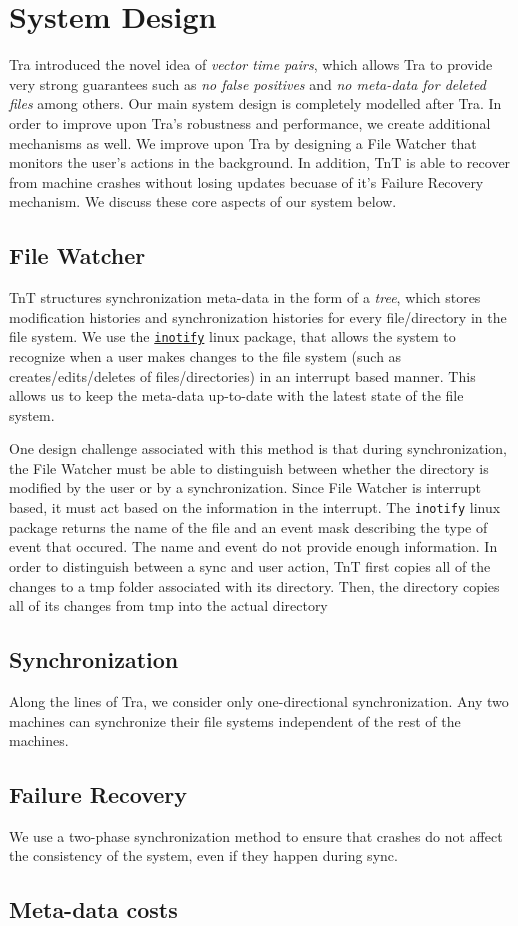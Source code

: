 \section{System Design}

Tra introduced the novel idea of {\em vector time pairs}, which allows Tra to provide very strong guarantees such as {\em no false positives} and {\em no meta-data for deleted files} among others. Our main system design is completely modelled after Tra.  In order to improve upon Tra's robustness and performance, we create additional mechanisms as well.  We improve upon Tra by designing a File Watcher that monitors the user's actions in the background.  In addition, TnT is able to recover from machine crashes without losing updates becuase of it's Failure Recovery mechanism.  We discuss these core aspects of our system below.

\subsection{File Watcher}
TnT structures synchronization meta-data in the form of a {\em tree}, which stores modification histories and synchronization histories for every file/directory in the file system. We use the \href{http://godoc.org/code.google.com/p/go.exp/inotify}{\tt inotify} linux package, that allows the system to recognize when a user makes changes to the file system (such as creates/edits/deletes of files/directories) in an interrupt based manner. This allows us to keep the meta-data up-to-date with the latest state of the file system.

One design challenge associated with this method is that during synchronization, the File Watcher must be able to distinguish between whether the directory is modified by the user or by a synchronization.  Since File Watcher is interrupt based, it must act based on the information in the interrupt.  The {\tt inotify} linux package returns the name of the file and an event mask describing the type of event that occured.  The name and event do not provide enough information.  In order to distinguish between a sync and user action, TnT first copies all of the changes to a tmp folder associated with its directory.  Then, the directory copies all of its changes from tmp into the actual directory 

\subsection{Synchronization}
Along the lines of Tra, we consider only one-directional synchronization. Any two machines can synchronize their file systems independent of the rest of the machines.

\subsection{Failure Recovery}
We use a two-phase synchronization method to ensure that crashes do not affect the consistency of the system, even if they happen during sync.

\subsection{Meta-data costs}